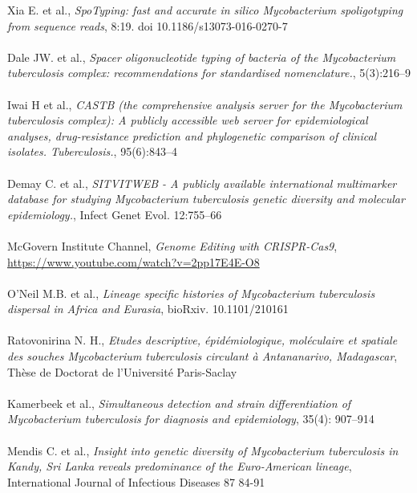 \documentclass[twoside,a4paper,11pt,frenchb,openany]{report}
\begin{document}
\begin{spacing}{0.5}
\begin{thebibliography}{10}
Xia E. et al., \textit{SpoTyping: fast and accurate in silico Mycobacterium spoligotyping from sequence reads}, 8:19. doi 10.1186/s13073-016-0270-7\\ \\ 

Dale JW. et al., \textit{Spacer oligonucleotide typing of bacteria of the Mycobacterium tuberculosis complex: recommendations for standardised nomenclature.}, 5(3):216–9\\ \\

Iwai H et al., \textit{CASTB (the comprehensive analysis server for the Mycobacterium tuberculosis complex): A publicly accessible web server for epidemiological analyses, drug-resistance prediction and phylogenetic comparison of clinical isolates. Tuberculosis.}, 95(6):843–4\\ \\

Demay C. et al., \textit{SITVITWEB - A publicly available international multimarker database for studying Mycobacterium tuberculosis genetic diversity and molecular epidemiology.}, Infect Genet Evol. 12:755–66\\ \\

\bibitem{}McGovern Institute Channel, \textit{Genome Editing with CRISPR-Cas9}, \url{https://www.youtube.com/watch?v=2pp17E4E-O8}\\ \\

O'Neil M.B. et al., \textit{Lineage specific histories of Mycobacterium tuberculosis dispersal in Africa and Eurasia}, bioRxiv. 10.1101/210161\\ \\

Ratovonirina N. H., \textit{Etudes descriptive, épidémiologique, moléculaire et spatiale des souches Mycobacterium tuberculosis circulant à Antananarivo, Madagascar}, Thèse de Doctorat de l'Université Paris-Saclay\\ \\

Kamerbeek et al., \textit{Simultaneous detection and strain differentiation of Mycobacterium tuberculosis for diagnosis and epidemiology}, 35(4): 907–914\\ \\

Mendis C. et al., \textit{Insight into genetic diversity of Mycobacterium tuberculosis in Kandy, Sri Lanka reveals predominance of the Euro-American lineage}, International Journal of Infectious Diseases 87 84-91\\ \\


\end{thebibliography}
\end{spacing}
\end{document}
